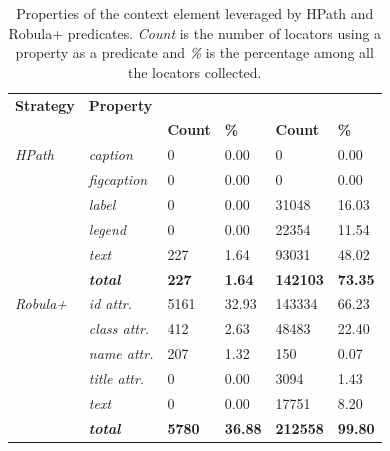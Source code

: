 \begin{table}
\caption{Properties of the context element leveraged by HPath and Robula+ predicates. \emph{Count} is the number of locators using a property as a predicate and \emph{\%} is the percentage among all the locators collected.}
\label{tab:hpath-results-properties}
\begin{center}
\begin{tabular}{>{\raggedright}m{0.4in}>{\raggedright}m{0.5in}>{\raggedleft}m{0.25in} >{\raggedleft}m{0.2in}>{\raggedleft}m{0.4in} >{\raggedleft}m{0.2in}}
\toprule
\textbf{\scriptsize{Strategy}} & \textbf{\scriptsize{Property}} & \multicolumn{2}{c}{\textbf{\scriptsize{MISO LIMS}}} & \multicolumn{2}{c}{\textbf{\scriptsize{OpenOLAT}}}\tabularnewline
&   & \textbf{\scriptsize{Count}} & \textbf{\scriptsize{\%}} & \textbf{\scriptsize{Count}} & \textbf{\scriptsize{\%}}\tabularnewline
\toprule
\scriptsize{\textit{HPath}} & \scriptsize{\textit{caption}} & \scriptsize{0} & \scriptsize{0.00} & \scriptsize{0} & \scriptsize{0.00}\tabularnewline
& \scriptsize{\textit{figcaption}} & \scriptsize{0} & \scriptsize{0.00} & \scriptsize{0} & \scriptsize{0.00}\tabularnewline
& \scriptsize{\textit{label}} & \scriptsize{0} & \scriptsize{0.00} & \scriptsize{31048} & \scriptsize{16.03}\tabularnewline
& \scriptsize{\textit{legend}} & \scriptsize{0} & \scriptsize{0.00} & \scriptsize{22354} & \scriptsize{11.54}\tabularnewline
& \scriptsize{\textit{text}} & \scriptsize{227} & \scriptsize{1.64} & \scriptsize{93031} & \scriptsize{48.02}\tabularnewline
& \scriptsize{\textit{\textbf{total}}} & \scriptsize{\textbf{227}} & \scriptsize{\textbf{1.64}} & \scriptsize{\textbf{142103}} & \scriptsize{\textbf{73.35}}\tabularnewline
\hline
\scriptsize{\textit{Robula+}} & \scriptsize{\textit{id attr.}} & \scriptsize{5161} & \scriptsize{32.93} & \scriptsize{143334} & \scriptsize{66.23}\tabularnewline
& \scriptsize{\textit{class attr.}} & \scriptsize{412} & \scriptsize{2.63} & \scriptsize{48483} & \scriptsize{22.40}\tabularnewline
& \scriptsize{\textit{name attr.}} & \scriptsize{207} & \scriptsize{1.32} & \scriptsize{150} & \scriptsize{0.07}\tabularnewline
& \scriptsize{\textit{title attr.}} & \scriptsize{0} & \scriptsize{0.00} & \scriptsize{3094} & \scriptsize{1.43}\tabularnewline
& \scriptsize{\textit{text}} & \scriptsize{0} & \scriptsize{0.00} & \scriptsize{17751} & \scriptsize{8.20}\tabularnewline
& \scriptsize{\textit{\textbf{total}}} & \scriptsize{\textbf{5780}} & \scriptsize{\textbf{36.88}} & \scriptsize{\textbf{212558}} & \scriptsize{\textbf{99.80}}\tabularnewline
\bottomrule
\end{tabular}
\end{center}
\end{table}

